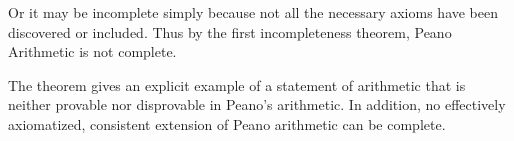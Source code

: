 \documentclass[a4paper,10pt]{article} %
\begin{document}
Or it may be incomplete simply because not all the necessary axioms have been discovered or included.  Thus by the first incompleteness theorem, Peano Arithmetic is not complete.

The theorem gives an explicit example of a statement of arithmetic that is neither provable nor disprovable in Peano's arithmetic. In addition, no effectively axiomatized, consistent extension of Peano arithmetic can be complete.

























\end{document}
